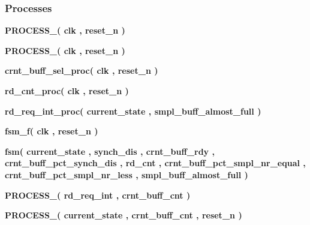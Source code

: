 \subsubsection*{Processes}
 \begin{DoxyCompactItemize}
\item 
{\bf P\+R\+O\+C\+E\+S\+S\+\_}{\bfseries  ( {\bfseries {\bfseries {\bf clk}} \textcolor{vhdlchar}{ }} , {\bfseries {\bfseries {\bf reset\+\_\+n}} \textcolor{vhdlchar}{ }} )}
\item 
{\bf P\+R\+O\+C\+E\+S\+S\+\_}{\bfseries  ( {\bfseries {\bfseries {\bf clk}} \textcolor{vhdlchar}{ }} , {\bfseries {\bfseries {\bf reset\+\_\+n}} \textcolor{vhdlchar}{ }} )}
\item 
{\bf crnt\+\_\+buff\+\_\+sel\+\_\+proc}{\bfseries  ( {\bfseries {\bfseries {\bf clk}} \textcolor{vhdlchar}{ }} , {\bfseries {\bfseries {\bf reset\+\_\+n}} \textcolor{vhdlchar}{ }} )}
\item 
{\bf rd\+\_\+cnt\+\_\+proc}{\bfseries  ( {\bfseries {\bfseries {\bf clk}} \textcolor{vhdlchar}{ }} , {\bfseries {\bfseries {\bf reset\+\_\+n}} \textcolor{vhdlchar}{ }} )}
\item 
{\bf rd\+\_\+req\+\_\+int\+\_\+proc}{\bfseries  ( {\bfseries {\bfseries {\bf current\+\_\+state}} \textcolor{vhdlchar}{ }} , {\bfseries {\bfseries {\bf smpl\+\_\+buff\+\_\+almost\+\_\+full}} \textcolor{vhdlchar}{ }} )}
\item 
{\bf fsm\+\_\+f}{\bfseries  ( {\bfseries {\bfseries {\bf clk}} \textcolor{vhdlchar}{ }} , {\bfseries {\bfseries {\bf reset\+\_\+n}} \textcolor{vhdlchar}{ }} )}
\item 
{\bf fsm}{\bfseries  ( {\bfseries {\bfseries {\bf current\+\_\+state}} \textcolor{vhdlchar}{ }} , {\bfseries {\bfseries {\bf synch\+\_\+dis}} \textcolor{vhdlchar}{ }} , {\bfseries {\bfseries {\bf crnt\+\_\+buff\+\_\+rdy}} \textcolor{vhdlchar}{ }} , {\bfseries {\bfseries {\bf crnt\+\_\+buff\+\_\+pct\+\_\+synch\+\_\+dis}} \textcolor{vhdlchar}{ }} , {\bfseries {\bfseries {\bf rd\+\_\+cnt}} \textcolor{vhdlchar}{ }} , {\bfseries {\bfseries {\bf crnt\+\_\+buff\+\_\+pct\+\_\+smpl\+\_\+nr\+\_\+equal}} \textcolor{vhdlchar}{ }} , {\bfseries {\bfseries {\bf crnt\+\_\+buff\+\_\+pct\+\_\+smpl\+\_\+nr\+\_\+less}} \textcolor{vhdlchar}{ }} , {\bfseries {\bfseries {\bf smpl\+\_\+buff\+\_\+almost\+\_\+full}} \textcolor{vhdlchar}{ }} )}
\item 
{\bf P\+R\+O\+C\+E\+S\+S\+\_}{\bfseries  ( {\bfseries {\bfseries {\bf rd\+\_\+req\+\_\+int}} \textcolor{vhdlchar}{ }} , {\bfseries {\bfseries {\bf crnt\+\_\+buff\+\_\+cnt}} \textcolor{vhdlchar}{ }} )}
\item 
{\bf P\+R\+O\+C\+E\+S\+S\+\_}{\bfseries  ( {\bfseries {\bfseries {\bf current\+\_\+state}} \textcolor{vhdlchar}{ }} , {\bfseries {\bfseries {\bf crnt\+\_\+buff\+\_\+cnt}} \textcolor{vhdlchar}{ }} , {\bfseries {\bfseries {\bf reset\+\_\+n}} \textcolor{vhdlchar}{ }} )}
\end{DoxyCompactItemize}
